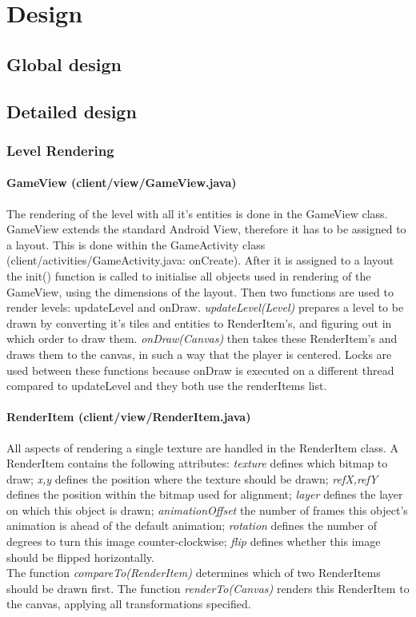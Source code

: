 \documentclass[../main.tex]{subfiles}
\begin{document}
\pagebreak
\section{Design}

	\subsection{Global design}

	\subsection{Detailed design}
		\subsubsection{Level Rendering}
			\paragraph{GameView (\tiny client/view/GameView.java\normalsize)}
			The rendering of the level with all it's entities is done in the GameView class. GameView extends the standard Android View, therefore it has to be assigned to a layout. This is done within the GameActivity class (\tiny client/activities/GameActivity.java: onCreate\normalsize). After it is assigned to a layout the init() function is called to initialise all objects used in rendering of the GameView, using the dimensions of the layout. Then two functions are used to render levels: updateLevel and onDraw. \textit{updateLevel(Level)} prepares a level to be drawn by converting it's tiles and entities to RenderItem's, and figuring out in which order to draw them. \textit{onDraw(Canvas)} then takes these RenderItem's and draws them to the canvas, in such a way that the player is centered. Locks are used between these functions because onDraw is executed on a different thread compared to updateLevel and they both use the renderItems list.

			\paragraph{RenderItem (\tiny client/view/RenderItem.java\normalsize)} All aspects of rendering a single texture are handled in the RenderItem class. A RenderItem contains the following attributes: \textit{texture} defines which bitmap to draw; \textit{x,y} defines the position where the texture should be drawn; \textit{refX,refY} defines the position within the bitmap used for alignment; \textit{layer} defines the layer on which this object is drawn; \textit{animationOffset} the number of frames this object's animation is ahead of the default animation; \textit{rotation} defines the number of degrees to turn this image counter-clockwise; \textit{flip} defines whether this image should be flipped horizontally.\\
			The function \textit{compareTo(RenderItem)} determines which of two RenderItems should be drawn first. The function \textit{renderTo(Canvas)} renders this RenderItem to the canvas, applying all transformations specified.
\end{document}
